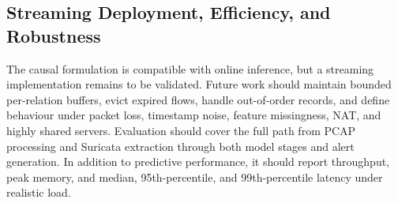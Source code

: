 \documentclass[11pt,fleqn]{report}
\begin{document}
\subsection{Streaming Deployment, Efficiency, and Robustness}
\label{subsubsec:future_streaming_deployment}

The causal formulation is compatible with online inference, but a streaming implementation remains to be validated. Future work should maintain bounded per-relation buffers, evict expired flows, handle out-of-order records, and define behaviour under packet loss, timestamp noise, feature missingness, NAT, and highly shared servers. Evaluation should cover the full path from PCAP processing and Suricata extraction through both model stages and alert generation. In addition to predictive performance, it should report throughput, peak memory, and median, 95th-percentile, and 99th-percentile latency under realistic load.


\end{document}
